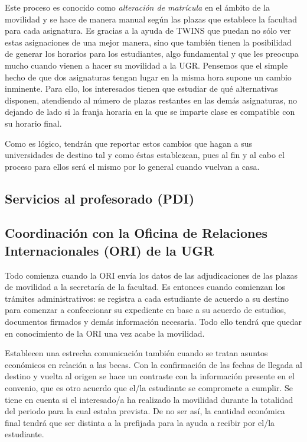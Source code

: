 Este proceso es conocido como \textit{alteración de matrícula} en el ámbito de la movilidad y se hace de manera manual según las plazas que establece la facultad para cada asignatura. Es gracias a la ayuda de TWINS que puedan no sólo ver estas asignaciones de una mejor manera, sino que también tienen la posibilidad de generar los horarios para los estudiantes, algo fundamental y que les preocupa mucho cuando vienen a hacer su movilidad a la UGR. Pensemos que el simple hecho de que dos asignaturas tengan lugar en la misma hora supone un cambio inminente. Para ello, los interesados tienen que estudiar de qué alternativas disponen, atendiendo al número de plazas restantes en las demás asignaturas, no dejando de lado si la franja horaria en la que se imparte clase es compatible con su horario final.

Como es lógico, tendrán que reportar estos cambios que hagan a sus universidades de destino tal y como éstas establezcan, pues al fin y al cabo el proceso para ellos será el mismo por lo general cuando vuelvan a casa.


\subsection{Servicios al profesorado (PDI)}

\subsection{Coordinación con la Oficina de Relaciones Internacionales (ORI) de la UGR}

Todo comienza cuando la ORI envía los datos de las adjudicaciones de las plazas de movilidad a la secretaría de la facultad. Es entonces cuando comienzan los trámites administrativos: se registra a cada estudiante de acuerdo a su destino para comenzar a confeccionar su expediente en base a su acuerdo de estudios, documentos firmados y demás información necesaria. Todo ello tendrá que quedar en conocimiento de la ORI una vez acabe la movilidad.

Establecen una estrecha comunicación también cuando se tratan asuntos económicos en relación a las becas. Con la confirmación de las fechas de llegada al destino y vuelta al origen se hace un contraste con la información presente en el convenio, que es otro acuerdo que el/la estudiante se compromete a cumplir. Se tiene en cuenta si el interesado/a ha realizado la movilidad durante la totalidad del periodo para la cual estaba prevista. De no ser así, la cantidad económica final tendrá que ser distinta a la prefijada para la ayuda a recibir por el/la estudiante.

